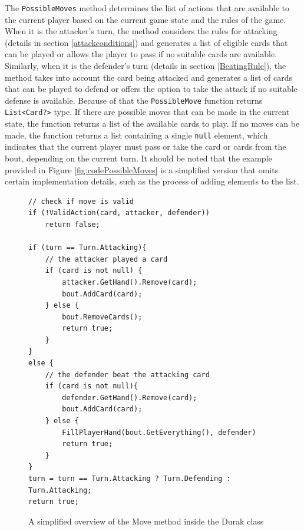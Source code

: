 The \texttt{PossibleMoves} method determines the list of actions that are available to the current player based on the current game state and the rules of the game. When it is the attacker's turn, the method considers the rules for attacking (details in section \ref{attackconditions}) and generates a list of eligible cards that can be played or allows the player to pass if no suitable cards are available. Similarly, when it is the defender's turn (details in section \ref{BeatingRule}), the method takes into account the card being attacked and generates a list of cards that can be played to defend or offers the option to take the attack if no suitable defense is available. Because of that the \texttt{PossibleMove} function returns \texttt{List<Card?>} type. If there are possible moves that can be made in the current state, the function returns a list of the available cards to play. If no moves can be made, the function returns a list containing a single \texttt{null} element, which indicates that the current player must pass or take the card or cards from the bout, depending on the current turn. It should be noted that the example provided in Figure \ref{fig:codePossibleMoves} is a simplified version that omits certain implementation details, such as the process of adding elements to the list. 

\begin{figure}[h]
\captionsetup{justification=centering}
\begin{lstlisting}
// check if move is valid
if (!ValidAction(card, attacker, defender)) 
	return false;
	
if (turn == Turn.Attacking){
	// the attacker played a card	
	if (card is not null) {
		attacker.GetHand().Remove(card);
		bout.AddCard(card);
	} else {
		bout.RemoveCards();
		return true;
	}
}
else {
	// the defender beat the attacking card
	if (card is not null){
		defender.GetHand().Remove(card);
		bout.AddCard(card);
	} else {
		FillPlayerHand(bout.GetEverything(), defender)
		return true;
	}	
}
turn = turn == Turn.Attacking ? Turn.Defending : Turn.Attacking;
return true;
\end{lstlisting}
\caption{A simplified overview of the Move method inside the Durak class}
\label{fig:codeMove}
\end{figure}

